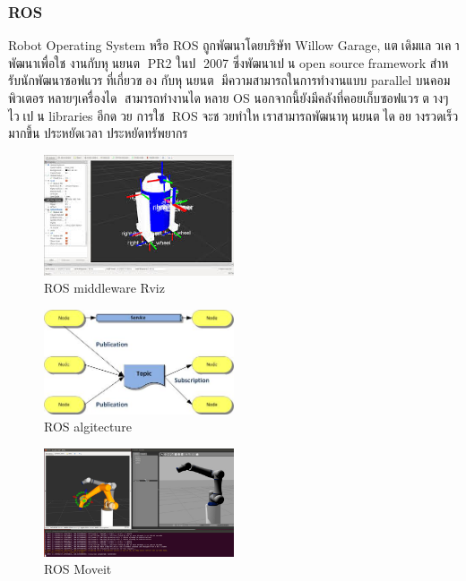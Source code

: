 \subsubsection*{ROS}
Robot Operating System หรือ ROS ถูกพัฒนาโดยบริษัท Willow Garage, แตเดิมแลวเคาพัฒนาเพื่อใช
งานกับหุนยนต PR2 ในป 2007 ซึ่งพัฒนาเปน open source framework สําหรับนักพัฒนาซอฟแวรที่เกี่ยวของ
กับหุนยนต มีความสามารถในการทํางานแบบ parallel บนคอมพิวเตอรหลายๆเครื่องได สามารถทํางานไดหลาย
OS นอกจากนี้ยังมีคลังที่คอยเก็บซอฟแวรตางๆไวเปน libraries อีกดวย การใช ROS
จะชวยทําใหเราสามารถพัฒนาหุนยนตไดอยางรวดเร็วมากขึ้น ประหยัดเวลา ประหยัดทรัพยากร

\begin{figure}[ht]
    \centering
    \includegraphics[width=0.5\textwidth]{chapter2/images/mdw_ros.jpeg}
    \caption{ROS middleware Rviz}
    \label{fig:mdw_ros}
\end{figure}
\begin{figure}[ht]
    \centering
    \includegraphics[width=0.5\textwidth]{chapter2/images/mdw_ros2.jpeg}
    \caption{ROS algitecture}
    \label{fig:mdw_ros2}
\end{figure}
\begin{figure}[ht]
    \centering
    \includegraphics[width=0.5\textwidth]{chapter2/images/mdw_ros3.jpeg}
    \caption{ROS Moveit}
    \label{fig:mdw_ros3}
\end{figure}

